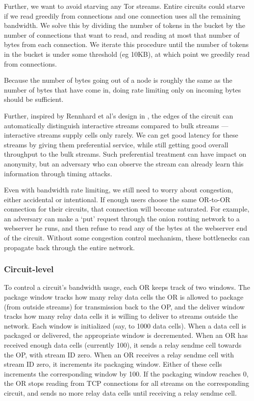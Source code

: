 \documentclass[times,10pt,twocolumn]{article}
\begin{document}
Further, we want to avoid starving any Tor streams. Entire circuits
could starve if we read greedily from connections and one connection
uses all the remaining bandwidth. We solve this by dividing the number
of tokens in the bucket by the number of connections that want to read,
and reading at most that number of bytes from each connection. We iterate
this procedure until the number of tokens in the bucket is under some
threshold (eg 10KB), at which point we greedily read from connections.

Because the number of bytes going out of a node is roughly the same
as the number of bytes that have come in, doing rate limiting only on
incoming bytes should be sufficient.

Further, inspired by Rennhard et al's design in \cite{anonnet}, the edges
of the circuit can automatically distinguish interactive streams compared
to bulk streams --- interactive streams supply cells only rarely. We can
get good latency for these streams by giving them preferential service,
while still getting good overall throughput to the bulk streams. Such
preferential treatment can have impact on anonymity, but an adversary
who can observe the stream can already learn this information through
timing attacks.

\label{subsec:congestion}

Even with bandwidth rate limiting, we still need to worry about
congestion, either accidental or intentional. If enough users choose
the same OR-to-OR connection for their circuits, that connection
will become saturated. For example, an adversary can make a `put'
request through the onion routing network to a webserver he runs,
and then refuse to read any of the bytes at the webserver end of the
circuit. Without some congestion control mechanism, these bottlenecks
can propagate back through the entire network.

\subsubsection{Circuit-level}

To control a circuit's bandwidth usage, each OR keeps track of two
windows. The package window tracks how many relay data cells the OR is
allowed to package (from outside streams) for transmission back to the OP,
and the deliver window tracks how many relay data cells it is willing
to deliver to streams outside the network. Each window is initialized
(say, to 1000 data cells). When a data cell is packaged or delivered,
the appropriate window is decremented. When an OR has received enough
data cells (currently 100), it sends a relay sendme cell towards the OP,
with stream ID zero. When an OR receives a relay sendme cell with stream
ID zero, it increments its packaging window. Either of these cells
increments the corresponding window by 100. If the packaging window
reaches 0, the OR stops reading from TCP connections for all streams
on the corresponding circuit, and sends no more relay data cells until
receiving a relay sendme cell.
\end{document}
